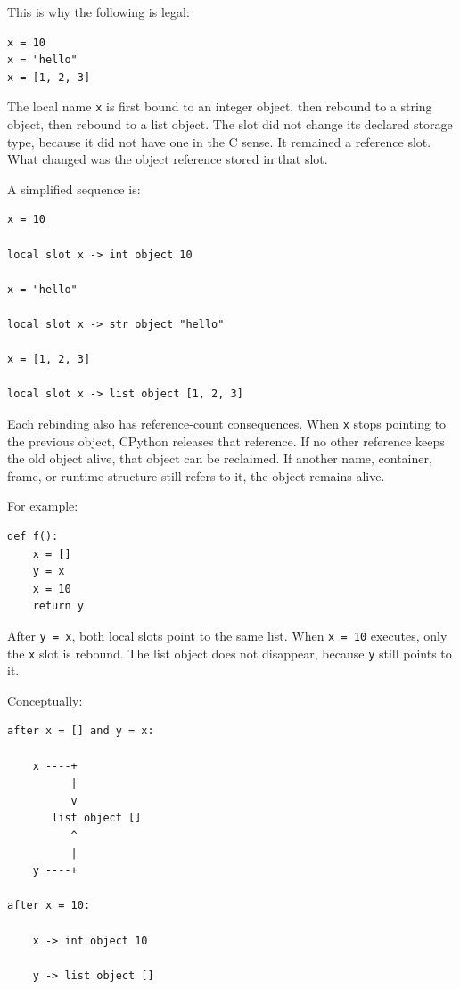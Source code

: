 This is why the following is legal:

\begin{verbatim}
x = 10
x = "hello"
x = [1, 2, 3]
\end{verbatim}

The local name \texttt{x} is first bound to an integer object, then rebound to a string object, then rebound to a list object. The slot did not change its declared storage type, because it did not have one in the C sense. It remained a reference slot. What changed was the object reference stored in that slot.

A simplified sequence is:

\begin{verbatim}
x = 10

local slot x -> int object 10

x = "hello"

local slot x -> str object "hello"

x = [1, 2, 3]

local slot x -> list object [1, 2, 3]
\end{verbatim}

Each rebinding also has reference-count consequences. When \texttt{x} stops pointing to the previous object, CPython releases that reference. If no other reference keeps the old object alive, that object can be reclaimed. If another name, container, frame, or runtime structure still refers to it, the object remains alive.

For example:

\begin{verbatim}
def f():
    x = []
    y = x
    x = 10
    return y
\end{verbatim}

After \texttt{y = x}, both local slots point to the same list. When \texttt{x = 10} executes, only the \texttt{x} slot is rebound. The list object does not disappear, because \texttt{y} still points to it.

Conceptually:

\begin{verbatim}
after x = [] and y = x:

    x ----+
          |
          v
       list object []
          ^
          |
    y ----+

after x = 10:

    x -> int object 10

    y -> list object []
\end{verbatim}

